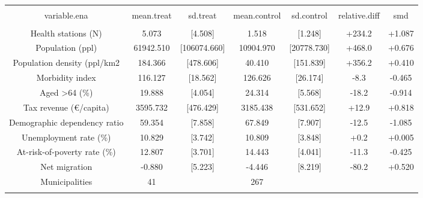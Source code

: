 
\begin{table}[!htbp] \centering 
  \caption{} 
  \label{} 
\begin{tabular}{@{\extracolsep{5pt}} ccccccc} 
\\[-1.8ex]\hline 
\hline \\[-1.8ex] 
variable.ena & mean.treat & sd.treat & mean.control & sd.control & relative.diff & smd \\ 
\hline \\[-1.8ex] 
Health stations (N) &     5.073 & [4.508] &     1.518 & [1.248] & +234.2 & +1.087 \\ 
Population (ppl) & 61942.510 & [106074.660] & 10904.970 & [20778.730] & +468.0 & +0.676 \\ 
Population density (ppl/km2 &   184.366 & [478.606] &    40.410 & [151.839] & +356.2 & +0.410 \\ 
Morbidity index &   116.127 & [18.562] &   126.626 & [26.174] &  -8.3 & -0.465 \\ 
Aged \textgreater 64 (\%) &    19.888 & [4.054] &    24.314 & [5.568] & -18.2 & -0.914 \\ 
Tax revenue (€/capita) &  3595.732 & [476.429] &  3185.438 & [531.652] & +12.9 & +0.818 \\ 
Demographic dependency ratio &    59.354 & [7.858] &    67.849 & [7.907] & -12.5 & -1.085 \\ 
Unemployment rate (\%) &    10.829 & [3.742] &    10.809 & [3.848] & +0.2 & +0.005 \\ 
At-risk-of-poverty rate (\%) &    12.807 & [3.701] &    14.443 & [4.041] & -11.3 & -0.425 \\ 
Net migration &    -0.880 & [5.223] &    -4.446 & [8.219] & -80.2 & +0.520 \\ 
Municipalities & 41 &  & 267 &  &  &  \\ 
\hline \\[-1.8ex] 
\end{tabular} 
\end{table} 
